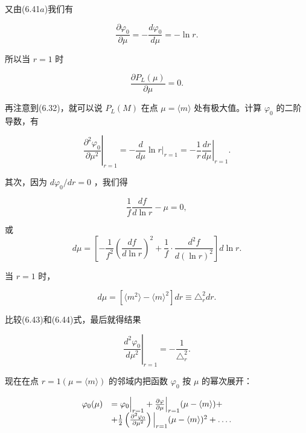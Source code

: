 又由(6.41$a$)我们有

\begin{equation*}
\frac {\partial \varphi_ {0}}{\partial \mu} = - \frac {d \varphi_ {0}}{d \mu} = - \ln r.
\end{equation*}

所以当 $r = 1$ 时

\begin{equation*}
\frac {\partial P _ {L} (\mu)}{\partial \mu} = 0.
\end{equation*}

再注意到(6.32)，就可以说 $P_{L}(M)$ 在点 $\mu = \langle m\rangle$ 处有极大值。计算 $\varphi_0$ 的二阶导数，有

\begin{equation*}
\left. \frac {\partial^ {2} \varphi_ {0}}{\partial \mu^ {2}} \right| _ {r = 1} = - \frac {d}{d \mu} \ln r \Big | _ {r = 1} = - \frac {1}{r} \left. \frac {d r}{d \mu} \right| _ {r = 1}.\tag{6.43}
\end{equation*}

其次，因为 $d\varphi_0 / dr = 0$ ，我们得

\begin{equation*}
\frac {1}{f} \frac {d f}{d \ln r} - \mu = 0,
\end{equation*}

或
\begin{equation*}
d \mu = \left[ - \frac {1}{f ^ {2}} \left(\frac {d f}{d \ln r}\right) ^ {2} + \frac {1}{f} \cdot \frac {d ^ {2} f}{d (\ln r) ^ {2}} \right] d \ln r.
\end{equation*}

当 $r = 1$ 时，

\begin{equation*}
d \mu = [ \langle m ^ {2} \rangle - \langle m \rangle^ {2} ] d r \equiv \triangle_ {r} ^ {2} d r.\tag{6.44}
\end{equation*}

比较(6.43)和(6.44)式，最后就得结果

\begin{equation*}
\left. \frac {d ^ {2} \varphi_ {0}}{d \mu^ {2}} \right| _ {r = 1} = - \frac {1}{\triangle_ {r} ^ {2}}.\tag{6.45}
\end{equation*}

现在在点 $r = 1(\mu = \langle m\rangle)$ 的邻域内把函数 $\varphi_0$ 按 $\mu$ 的幂次展开：

\begin{equation*}
\begin{array}{r l} \varphi_ {0} (\mu) & = \varphi_ {0} \Big | _ {r = 1} + \frac {\partial \varphi}{\partial \mu} \Big | _ {r = 1} (\mu - \langle m \rangle) + \\ & + \frac {1}{2} \left(\frac {\partial^ {2} \varphi_ {0}}{\partial \mu^ {2}}\right) \Big | _ {r = 1} (\mu - \langle m \rangle) ^ {2} + \dots . \end{array}
\end{equation*}

